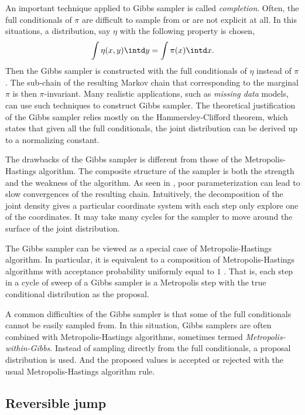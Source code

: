 An important technique applied to Gibbs sampler is called \emph{completion}.
Often, the full conditionals of $\pi$ are difficult to sample from or are not
explicit at all. In this situations, a distribution, say $\eta$ with the
following property is chosen,
\begin{equation}
  \int\eta(x,y)\intd y = \int\pi(x)\intd x.
\end{equation}
Then the Gibbs sampler is constructed with the full conditionals of $\eta$
instead of $\pi$. The sub-chain of the resulting Markov chain that
corresponding to the marginal $\pi$ is then $\pi$-invariant. Many realistic
applications, such as \emph{missing data} models, can use such techniques to
construct Gibbs sampler. The theoretical justification of the Gibbs sampler
relies mostly on the Hammersley-Clifford theorem, which states that given all
the full conditionals, the joint distribution can be derived up to a
normalizing constant.

The drawbacks of the Gibbs sampler is different from those of the
Metropolis-Hastings algorithm. The composite structure of the sampler is both
the strength and the weakness of the algorithm. As seen in
\cite{Hills:1993vb}, poor parameterization can lead to slow convergences of
the resulting chain. Intuitively, the decomposition of the joint density gives
a particular coordinate system with each step only explore one of the
coordinates. It may take many cycles for the sampler to move around the
surface of the joint distribution.

The Gibbs sampler can be viewed as a special case of Metropolis-Hastings
algorithm. In particular, it is equivalent to a composition of
Metropolis-Hastings algorithms with acceptance probability uniformly equal to
$1$ \cite[][Theorem~10.13]{Robert:2004tn}. That is, each step in a cycle of
sweep of a Gibbs sampler is a Metropolis step with the true conditional
distribution as the proposal.

A common difficulties of the Gibbs sampler is that some of the full
conditionals cannot be easily sampled from. In this situation, Gibbs samplers
are often combined with Metropolis-Hastings algorithms, sometimes termed
\emph{Metropolis-within-Gibbs}. Instead of sampling directly from the full
conditionals, a proposal distribution is used. And the proposed values is
accepted or rejected with the usual Metropolis-Hastings algorithm rule.

\subsection{Reversible jump \protect\mcmc}
\label{sub:Reversible jump mcmc}

